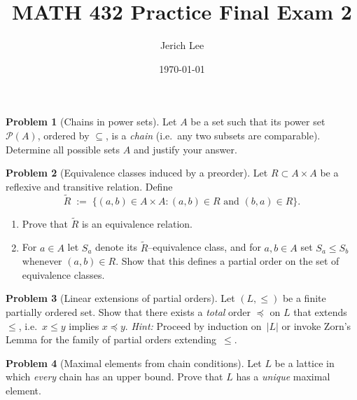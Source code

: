 \documentclass[12pt]{article}
\title{MATH 432 Practice Final Exam 2}
\author{Jerich Lee}
\date{\today}
\theoremstyle{definition} %
\newtheorem{problem}{Problem}
\theoremstyle{plain} %
\begin{document}
\maketitle


\begin{problem}[Chains in power sets]
  Let $A$ be a set such that its power set $\mathcal{P}(A)$,
  ordered by $\subseteq$, is a \emph{chain} (i.e.\ any two subsets are
  comparable).
  Determine all possible sets $A$ and justify your answer.
\end{problem}

\begin{problem}[Equivalence classes induced by a preorder]
  Let $R\subset A\times A$ be a reflexive and transitive relation.
  Define
  \[
      \widetilde{R}\;:=\;\bigl\{(a,b)\in A\times A: (a,b)\in R
      \text{ and }(b,a)\in R\bigr\}.
  \]
  \begin{enumerate}[label=(\alph*)]
    \item Prove that $\widetilde{R}$ is an equivalence relation.
    \item For $a\in A$ let $S_a$ denote its
          $\widetilde{R}$–equivalence class, and for
          $a,b\in A$ set $S_a\le S_b$ whenever $(a,b)\in R$.
          Show that this defines a partial order on the set of
          equivalence classes.
  \end{enumerate}
\end{problem}

\begin{problem}[Linear extensions of partial orders]
  Let $(L,\le)$ be a finite partially ordered set.
  Show that there exists a \emph{total} order $\preccurlyeq$ on $L$
  that extends~$\le$, i.e.\ $x\le y$ implies $x\preccurlyeq y$.
  \emph{Hint:}  Proceed by induction on~$|L|$ or invoke Zorn’s Lemma
  for the family of partial orders extending~$\le$.
\end{problem}

\begin{problem}[Maximal elements from chain conditions]
  Let $L$ be a lattice in which \emph{every} chain has an upper bound.
  Prove that $L$ has a \emph{unique} maximal element.
\end{problem}
\end{document}
